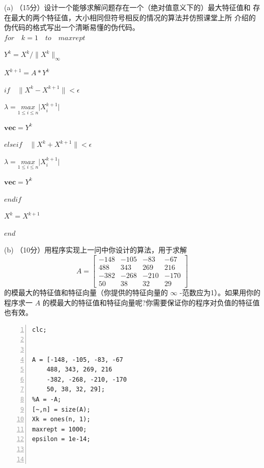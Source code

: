 \documentclass[12pt,a4paper,UTF8]{ctexart}
\begin{document}
\begin{enumerate}
	(a) （15分）设计一个能够求解问题存在一个（绝对值意义下的）最大特征值和
存在最大的两个特征值，大小相同但符号相反的情况的算法并仿照课堂上所
介绍的伪代码的格式写出一个清晰易懂的伪代码。\\

	$for \quad k = 1 \quad to\quad maxrept$
	
	\quad $Y^{k}=X^{k}/\lVert X^{k}\rVert_\infty$

	\quad $X^{k+1}=A*Y^{k}$

	\quad $if \quad \lVert X^{k}-X^{k+1}\rVert < \epsilon$

	\quad \quad $\lambda = \underset{1\le i\le n}{max} \lvert X^{k+1}_i \rvert$

	\quad \quad $\boldsymbol{vec} = Y^k$

	\quad $elseif \quad \lVert X^{k}+X^{k+1}\rVert < \epsilon$

	\quad \quad $\lambda = \underset{1\le i\le n}{max} \lvert X^{k+1}_i \rvert$

	\quad \quad $\boldsymbol{vec} = Y^k$

	\quad $endif$

	\quad $X^k=X^{k+1}$

	$end$


	(b) （10分）用程序实现上一问中你设计的算法，用于求解          
		\begin{equation}
        	A=\left[\begin{array}{rrrr}
      	      -148 & -105 & -83  & -67  \\
       	       488  & 343  & 269  & 216  \\
    	       -382 & -268 & -210 & -170 \\
     	         50   & 38   & 32   & 29
            \end{array}\right]
       	\end{equation}
	的模最大的特征值和特征向量（你提供的特征向量的 $\infty$ -范数应为1）。如果用你的程序求一 $A$ 的模最大的特征值和特征向量呢?你需要保证你的程序对负值的特征值也有效。

	\begin{lstlisting}[frame=single,numbers=left]
	clc;


A = [-148, -105, -83, -67
    488, 343, 269, 216
    -382, -268, -210, -170
    50, 38, 32, 29];
%A = -A;
[~,n] = size(A);
Xk = ones(n, 1);
maxrept = 1000;
epsilon = 1e-14;



\end{lstlisting}
\end{enumerate}
\end{document}
